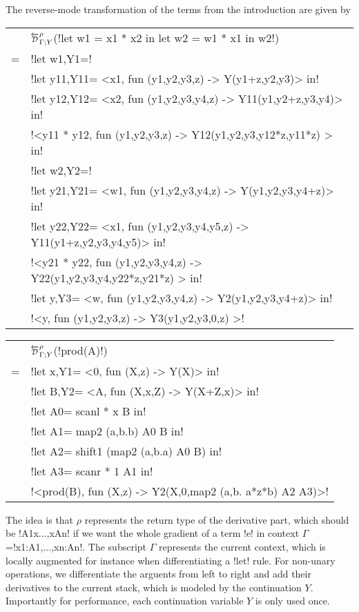 \begin{example}
    The reverse-mode transformation of the terms from the introduction are given by

    \begin{tabular}{c l}
        &$\directD{\rho}{\Gamma}{Y}$(!let w1 = x1 * x2 in let w2 = w1 * x1 in w2!) \\
        =& !let w1,Y1=!\\
        & \quad\quad !let y11,Y11= <x1, fun (y1,y2,y3,z) -> Y(y1+z,y2,y3)> in! \\
        & \quad\quad !let y12,Y12= <x2, fun (y1,y2,y3,y4,z) -> Y11(y1,y2+z,y3,y4)> in! \\
        & \quad\quad !<y11 * y12, fun (y1,y2,y3,z) -> Y12(y1,y2,y3,y12*z,y11*z) > in! \\
        & !let w2,Y2=!\\
        & \quad\quad !let y21,Y21= <w1, fun (y1,y2,y3,y4,z) -> Y(y1,y2,y3,y4+z)> in! \\
        & \quad\quad !let y22,Y22= <x1, fun (y1,y2,y3,y4,y5,z) -> Y11(y1+z,y2,y3,y4,y5)> in! \\
        & \quad\quad !<y21 * y22, fun (y1,y2,y3,y4,z) -> Y22(y1,y2,y3,y4,y22*z,y21*z) > in! \\
        & !let y,Y3= <w, fun (y1,y2,y3,y4,z) -> Y2(y1,y2,y3,y4+z)> in! \\
        & !<y, fun (y1,y2,y3,z) -> Y3(y1,y2,y3,0,z) >!
    \end{tabular}
    \medskip

    \begin{tabular}{c l}
        &$\directD{\rho}{\Gamma}{Y}$(!prod(A)!) \\
        =& !let x,Y1= <0, fun (X,z) -> Y(X)> in! \\
        & !let B,Y2= <A, fun (X,x,Z) -> Y(X+Z,x)> in!\\
        & !let A0= scanl * x B in!\\
        & !let A1= map2 (a,b.b) A0 B in!\\
        & !let A2= shift1 (map2 (a,b.a) A0 B) in!\\
        & !let A3= scanr * 1 A1 in!\\
        & !<prod(B), fun (X,z) -> Y2(X,0,map2 (a,b. a*z*b) A2 A3)>! 
    \end{tabular}
\end{example}

The idea is that $\rho$ represents the return type of the derivative part, which should be !A1x...,xAn! 
if we want the whole gradient of a term !e! in context $\Gamma$=!x1:A1,...,xn:An!.
The subscript $\Gamma$ represents the current context, 
which is locally augmented for instance when differentiating a !let! rule.
For non-unary operations, we differentiate the arguents from left to right and add their derivatives to the current stack, 
which is modeled by the continuation $Y$. 
Importantly for performance, each continuation variable $Y$ is only used once.

